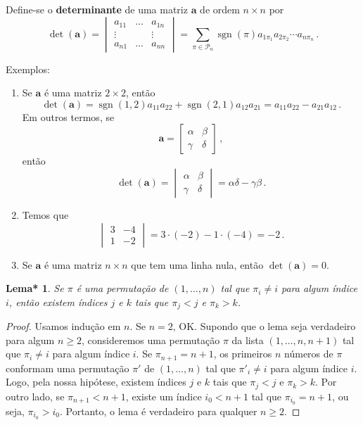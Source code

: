 \documentclass[12pt,a4paper]{report}
\newcommand{\tb}{\textbf}
\newcommand{\mb}{\mathbf}
\newcommand{\mc}{\mathcal}
\newtheorem{lem*}[thm]{Lema*}
\DeclareMathOperator{\sgn}{sgn}
\begin{document}
Define-se o \tb{determinante} de uma matriz $\mb a$ de ordem $n\times n$ por
$$\det(\mb a)=\begin{vmatrix}
  a_{11}&\ldots& a_{1n}\\
  \vdots&&\vdots\\
  a_{n1}&\ldots&a_{nn}
\end{vmatrix}=\sum_{\pi\in\mc P_n}\sgn(\pi)a_{1\pi_1}a_{2\pi_2}\cdots a_{n\pi_n}\,.$$

Exemplos:
\begin{enumerate}
  \item Se $\mb a$ é uma matriz $2\times 2$, então
 $$\det(\mb a)=\sgn(1,2)a_{11}a_{22}+\sgn(2,1)a_{12}a_{21}=a_{11}a_{22}-a_{21}a_{12}\,.$$
 Em outros termos, se
 $$\mb a=\begin{bmatrix}
   \alpha&\beta\\
   \gamma&\delta
 \end{bmatrix}\,,$$
 então
 $$\det(\mb a)=\begin{vmatrix}
   \alpha&\beta\\
   \gamma&\delta
 \end{vmatrix}=\alpha\delta-\gamma\beta\,.$$
 \item Temos que
 $$\begin{vmatrix}
   3&-4\\
   1&-2
 \end{vmatrix}=3\cdot (-2)-1\cdot (-4)=-2\,.$$
 \item Se $\mb a$ é uma matriz $n\times n$ que tem uma linha nula, então $\det(\mb a)=0$.
\end{enumerate}

\begin{lem*}
  \label{perm.nonid}
  Se $\pi$ é uma permutação de $(1,\ldots,n)$ tal que $\pi_i\ne i$ para algum índice $i$, então existem índices $j$ e $k$ tais que $\pi_j<j$ e $\pi_k>k$.
\end{lem*}
\begin{proof}
  Usamos indução em $n$. Se $n=2$, OK. Supondo que o lema seja verdadeiro para algum $n\ge 2$, consideremos uma permutação $\pi$ da lista $(1,\ldots,n,n+1)$ tal que $\pi_i\ne i$ para algum índice $i$. Se $\pi_{n+1}=n+1$, os primeiros $n$ números de $\pi$ conformam uma permutação $\pi'$ de $(1,\ldots,n)$ tal que $\pi'_i\ne i$ para algum índice $i$.
  Logo, pela nossa hipótese, existem índices $j$ e $k$ tais que $\pi_j<j$ e $\pi_k>k$.
  Por outro lado, se $\pi_{n+1}<n+1$, existe um índice $i_0<n+1$ tal que $\pi_{i_0}=n+1$, ou seja, $\pi_{i_0}>i_0$. Portanto, o lema é verdadeiro para qualquer $n\ge 2$.
\end{proof}
\end{document}
